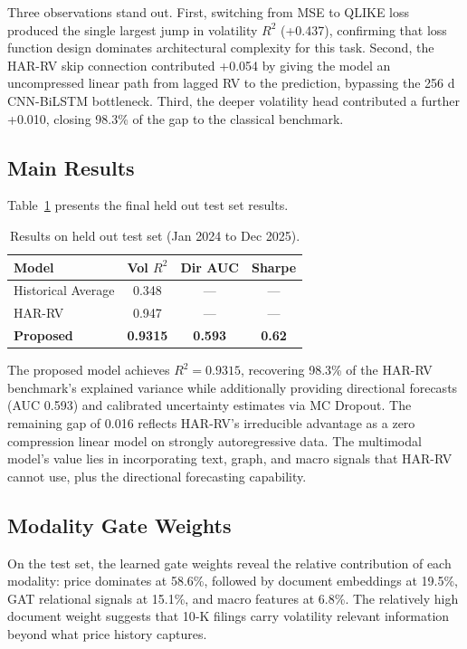 \documentclass[10pt, twocolumn, a4paper]{article}
\begin{document}
Three observations stand out. First, switching from MSE to QLIKE loss
produced the single largest jump in volatility $R^2$ (+0.437), confirming
that loss function design dominates architectural complexity for this task.
Second, the HAR{-}RV skip connection contributed +0.054 by giving the model
an uncompressed linear path from lagged RV to the prediction, bypassing the
256 d CNN{-}BiLSTM bottleneck. Third, the deeper volatility head contributed
a further +0.010, closing 98.3\% of the gap to the classical benchmark.

\subsection{Main Results}

Table~\ref{tab:main} presents the final held out test set results.

\begin{table}[H]
\centering
\small
\caption{Results on held out test set (Jan 2024 to Dec 2025).}
\label{tab:main}
\begin{tabular}{lccc}
\toprule
\textbf{Model} & \textbf{Vol $R^2$} & \textbf{Dir AUC} & \textbf{Sharpe} \\
\midrule
Historical Average   & 0.348  & ---   & ---  \\
HAR{-}RV             & 0.947  & ---   & ---  \\
\midrule
\textbf{Proposed}    & \textbf{0.9315} & \textbf{0.593} & \textbf{0.62} \\
\bottomrule
\end{tabular}
\end{table}

The proposed model achieves $R^2 = 0.9315$, recovering 98.3\% of the
HAR{-}RV benchmark's explained variance while additionally providing
directional forecasts (AUC 0.593) and calibrated uncertainty estimates
via MC Dropout. The remaining gap of 0.016 reflects HAR{-}RV's irreducible
advantage as a zero compression linear model on strongly autoregressive
data. The multimodal model's value lies in incorporating text, graph, and
macro signals that HAR{-}RV cannot use, plus the directional forecasting
capability.

\subsection{Modality Gate Weights}

On the test set, the learned gate weights reveal the relative contribution
of each modality: price dominates at 58.6\%, followed by document embeddings
at 19.5\%, GAT relational signals at 15.1\%, and macro features at 6.8\%.
The relatively high document weight suggests that 10{-}K filings carry
volatility relevant information beyond what price history captures.
\end{document}
